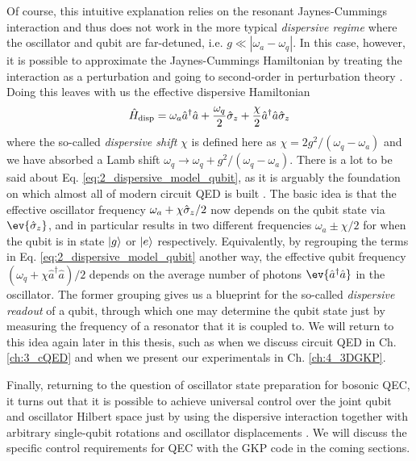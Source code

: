 Of course, this intuitive explanation relies on the resonant Jaynes-Cummings interaction and thus does not work in the more typical \textit{dispersive regime} where the oscillator and qubit are far-detuned, i.e. $g \ll |\omega_a - \omega_q|$. In this case, however, it is possible to approximate the Jaynes-Cummings Hamiltonian by treating the interaction as a perturbation and going to second-order in perturbation theory \cite{raimond2006exploring}. Doing this leaves with us the effective dispersive Hamiltonian
\begin{equation}
    \hat{H}_{\rm disp} = \omega_a \hat{a}^\dagger\hat{a} + \frac{\omega_q}{2}\hat{\sigma}_z + \frac{\chi}{2}\hat{a}^\dagger\hat{a}\hat{\sigma}_z
    \label{eq:2_dispersive_model_qubit}
\end{equation}
where the so-called \textit{dispersive shift} $\chi$ is defined here as $\chi = 2g^2/(\omega_q - \omega_a)$ and we have absorbed a Lamb shift $\omega_q \to \omega_q + g^2/(\omega_q - \omega_a)$. There is a lot to be said about Eq. \eqref{eq:2_dispersive_model_qubit}, as it is arguably the foundation on which almost all of modern circuit QED is built \cite{blais2004cavity}. The basic idea is that the effective oscillator frequency $\omega_a + \chi\hat{\sigma}_z/2$ now depends on the qubit state via $\ev{\sigmaz}$, and in particular results in two different frequencies $\omega_a \pm \chi/2$ for when the qubit is in state $\lvert g\rangle$ or $\lvert e\rangle$ respectively. Equivalently, by regrouping the terms in Eq. \eqref{eq:2_dispersive_model_qubit} another way, the effective qubit frequency $(\omega_q + \chi \hat{a}^\dagger\hat{a})/2$ depends on the average number of photons $\ev{\hat{a}^\dagger\hat{a}}$ in the oscillator. The former grouping gives us a blueprint for the so-called \textit{dispersive readout} of a qubit, through which one may determine the qubit state just by measuring the frequency of a resonator that it is coupled to. We will return to this idea again later in this thesis, such as when we discuss circuit QED in Ch. \ref{ch:3_cQED} and when we present our experimentals in Ch. \ref{ch:4_3DGKP}. 

Finally, returning to the question of oscillator state preparation for bosonic QEC, it turns out that it is possible to achieve universal control over the joint qubit and oscillator Hilbert space just by using the dispersive interaction together with arbitrary single-qubit rotations and oscillator displacements \cite{vlastakis2015controlling, reinhold2019controlling, eickbusch2022fast}. We will discuss the specific control requirements for QEC with the GKP code in the coming sections. 

